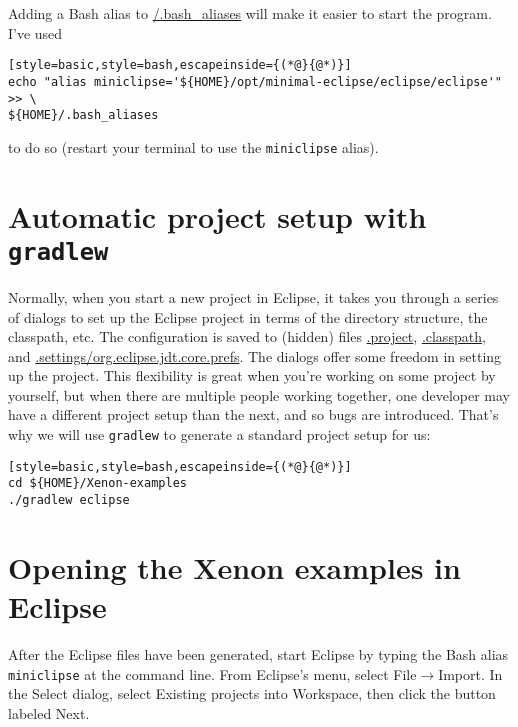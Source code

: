 
Adding a Bash alias to \mytilde\url{/.bash_aliases} will make it easier to start the program. I've used
\begin{lstlisting}[style=basic,style=bash,escapeinside={(*@}{@*)}]
echo "alias miniclipse='${HOME}/opt/minimal-eclipse/eclipse/eclipse'" >> \
${HOME}/.bash_aliases
\end{lstlisting}
to do so (restart your terminal to use the \texttt{miniclipse} alias).

\section{Automatic project setup with \texttt{gradlew}}


Normally, when you start a new project in Eclipse, it takes you through a series of dialogs to set up the Eclipse project in terms of the directory structure, the classpath, etc. The configuration is saved to (hidden) files \url{.project}, \url{.classpath}, and \url{.settings/org.eclipse.jdt.core.prefs}. The dialogs offer some freedom in setting up the project. This flexibility is great when you're working on some project by yourself, but when there are multiple people working together, one developer may have a different project setup than the next, and so bugs are introduced. That's why we will use \texttt{gradlew} to generate a standard project setup for us:

\begin{lstlisting}[style=basic,style=bash,escapeinside={(*@}{@*)}]
cd ${HOME}/Xenon-examples
./gradlew eclipse
\end{lstlisting} %

\section{Opening the Xenon examples in Eclipse}

After the Eclipse files have been generated, start Eclipse by typing the Bash alias \texttt{miniclipse} at the command line. From Eclipse's menu, select \textsf{File}$\rightarrow$\textsf{Import}. In the \textsf{Select} dialog, select \textsf{Existing projects into Workspace}, then click the button labeled \textsf{Next}.

